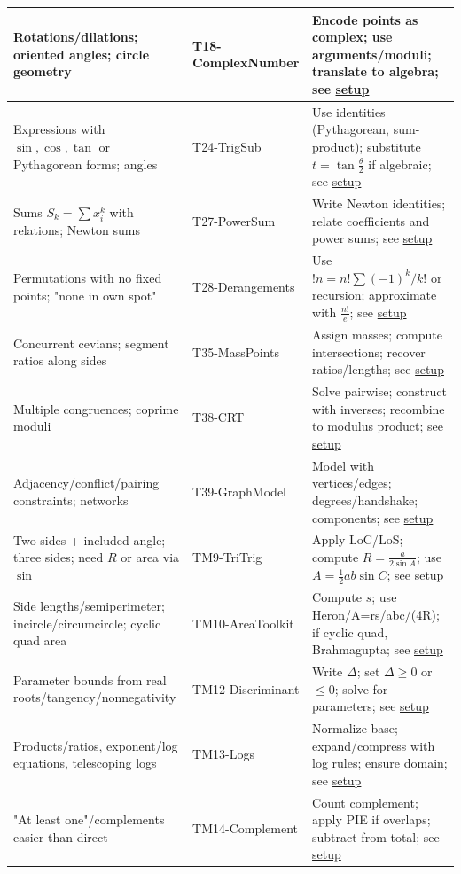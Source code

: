 \documentclass{article}
\begin{document}
\begin{center}
\begin{longtable}{|>{\raggedright\arraybackslash}m{}|>{\raggedright\arraybackslash}p{}|>{\raggedright\arraybackslash}p{}|}
\hline
Rotations/dilations; oriented angles; circle geometry & T18-ComplexNumber & Encode points as complex; use arguments/moduli; translate to algebra; see \hyperlink{technique-setup}{setup} \\
\hline
Expressions with $\sin,\cos,\tan$ or Pythagorean forms; angles & T24-TrigSub & Use identities (Pythagorean, sum-product); substitute $t=\tan\tfrac{\theta}{2}$ if algebraic; see \hyperlink{technique-setup}{setup} \\
\hline
Sums $S_k=\sum x_i^k$ with relations; Newton sums & T27-PowerSum & Write Newton identities; relate coefficients and power sums; see \hyperlink{technique-setup}{setup} \\
\hline
Permutations with no fixed points; "none in own spot" & T28-Derangements & Use $!n=n!\sum(-1)^k/k!$ or recursion; approximate with $\frac{n!}{e}$; see \hyperlink{technique-setup}{setup} \\
\hline
Concurrent cevians; segment ratios along sides & T35-MassPoints & Assign masses; compute intersections; recover ratios/lengths; see \hyperlink{technique-setup}{setup} \\
\hline
Multiple congruences; coprime moduli & T38-CRT & Solve pairwise; construct with inverses; recombine to modulus product; see \hyperlink{technique-setup}{setup} \\
\hline
Adjacency/conflict/pairing constraints; networks & T39-GraphModel & Model with vertices/edges; degrees/handshake; components; see \hyperlink{technique-setup}{setup} \\
\hline
Two sides + included angle; three sides; need $R$ or area via $\sin$ & TM9-TriTrig & Apply LoC/LoS; compute $R=\tfrac{a}{2\sin A}$; use $A=\tfrac{1}{2}ab\sin C$; see \hyperlink{technique-setup}{setup} \\
\hline
Side lengths/semiperimeter; incircle/circumcircle; cyclic quad area & TM10-AreaToolkit & Compute $s$; use Heron/A=rs/abc/(4R); if cyclic quad, Brahmagupta; see \hyperlink{technique-setup}{setup} \\
\hline
\hline
Parameter bounds from real roots/tangency/nonnegativity & TM12-Discriminant & Write $\Delta$; set $\Delta\ge 0$ or $\le 0$; solve for parameters; see \hyperlink{technique-setup}{setup} \\
\hline
Products/ratios, exponent/log equations, telescoping logs & TM13-Logs & Normalize base; expand/compress with log rules; ensure domain; see \hyperlink{technique-setup}{setup} \\
\hline
"At least one"/complements easier than direct & TM14-Complement & Count complement; apply PIE if overlaps; subtract from total; see \hyperlink{technique-setup}{setup} \\

\end{longtable}
\end{center}
\end{document}
